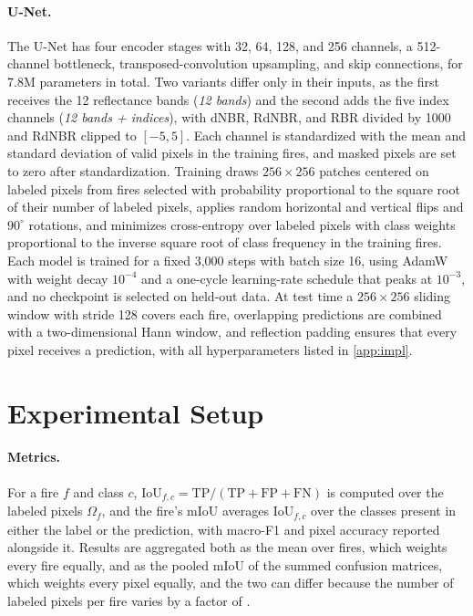\documentclass[10pt]{article}
\begin{document}
\paragraph{U-Net.}
The U-Net \citep{ronneberger2015unet} has four encoder stages with 32, 64, 128, and 256 channels, a 512-channel bottleneck, transposed-convolution upsampling, and skip connections, for 7.8M parameters in total.
Two variants differ only in their inputs, as the first receives the 12 reflectance bands (\emph{12 bands}) and the second adds the five index channels (\emph{12 bands + indices}), with dNBR, RdNBR, and RBR divided by 1000 and RdNBR clipped to $[-5, 5]$.
Each channel is standardized with the mean and standard deviation of valid pixels in the training fires, and masked pixels are set to zero after standardization.
Training draws $256 \times 256$ patches centered on labeled pixels from fires selected with probability proportional to the square root of their number of labeled pixels, applies random horizontal and vertical flips and $90^\circ$ rotations, and minimizes cross-entropy over labeled pixels with class weights proportional to the inverse square root of class frequency in the training fires.
Each model is trained for a fixed 3{,}000 steps with batch size 16, using AdamW \citep{loshchilov2019adamw} with weight decay $10^{-4}$ and a one-cycle learning-rate schedule \citep{smith2019superconvergence} that peaks at $10^{-3}$, and no checkpoint is selected on held-out data.
At test time a $256 \times 256$ sliding window with stride 128 covers each fire, overlapping predictions are combined with a two-dimensional Hann window, and reflection padding ensures that every pixel receives a prediction, with all hyperparameters listed in \cref{app:impl}.

\section{Experimental Setup}
\label{sec:setup}

\paragraph{Metrics.}
For a fire $f$ and class $c$, $\mathrm{IoU}_{f,c} = \mathrm{TP}/(\mathrm{TP} + \mathrm{FP} + \mathrm{FN})$ is computed over the labeled pixels $\Omega_f$, and the fire's mIoU averages $\mathrm{IoU}_{f,c}$ over the classes present in either the label or the prediction, with macro-F1 and pixel accuracy reported alongside it.
Results are aggregated both as the mean over fires, which weights every fire equally, and as the pooled mIoU of the summed confusion matrices, which weights every pixel equally, and the two can differ because the number of labeled pixels per fire varies by a factor of \aPxRatio.
\end{document}
